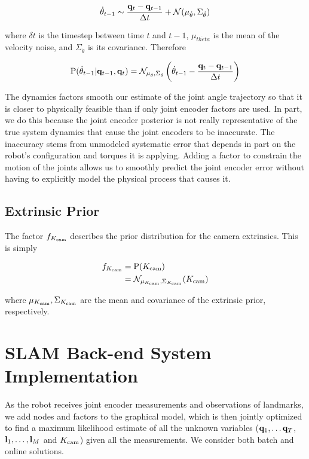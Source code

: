 \begin{equation}
	\dot{\theta}_{t - 1} \sim \frac{\mathbf{q}_{t} - \mathbf{q}_{t - 1}}{\Delta t} + \mathcal{N}(\mu_{\dot{\theta}}, \Sigma_{\dot{\theta}})
\end{equation}

\noindent where $\delta t$ is the timestep between time $t$ and $t-1$, $\mu_{\dot{theta}}$ is the mean of the velocity noise, and $\Sigma_{\dot{\theta}}$ is its covariance. Therefore

\begin{equation}
	\text{P}(\dot{\theta}_{t - 1} | \mathbf{q}_{t - 1}, \mathbf{q}_{t}) = \mathcal{N}_{\mu_{\dot{\theta}}, \Sigma_{\dot{\theta}}}\left(\dot{\theta}_{t - 1} - \frac{\mathbf{q}_{t} - \mathbf{q}_{t - 1}}{\Delta t}\right)
\end{equation} 

The dynamics factors smooth our estimate of the joint angle trajectory so that it is closer to physically feasible than if only joint encoder factors are used. In part, we do this because the joint encoder posterior is not really representative of the true system dynamics that cause the joint encoders to be inaccurate. The inaccuracy stems from unmodeled systematic error that depends in part on the robot's configuration and torques it is applying. Adding a factor to constrain the motion of the joints allows us to smoothly predict the joint encoder error without having to explicitly model the physical process that causes it.

\subsection{Extrinsic Prior}
The factor $f_{K_\text{cam}}$ describes the prior distribution for the camera extrinsics. This is simply

\begin{align}
	f_{K_\text{cam}} &= \text{P}(K_\text{cam}) \\
		      &= \mathcal{N}_{\mu_{K_\text{cam}}, \Sigma_{K_\text{cam}}}(K_\text{cam})
\end{align}

\noindent where $\mu_{K_\text{cam}}, \Sigma_{K_\text{cam}}$ are the mean and covariance of the extrinsic prior, respectively.

\section{SLAM Back-end System Implementation}
As the robot receives joint encoder measurements and observations of landmarks, we add nodes and factors to the graphical model, which is then jointly optimized to find a maximum likelihood estimate of all the unknown variables ($\mathbf{q}_1, \ldots \mathbf{q}_T$, $\mathbf{l}_1, \ldots, \mathbf{l}_M$ and $K_\text{cam}$) given all the measurements. We consider both batch and online solutions. 

